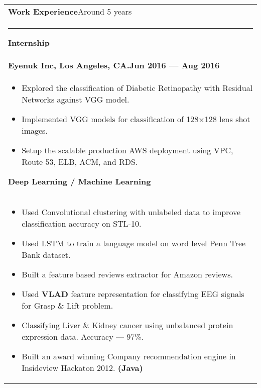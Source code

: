 \documentclass{article}
\begin{document}
\begin{tabular}{p{\dimexpr\linewidth-2\tabcolsep}}
    \textbf{\large{Work Experience}}\hfill Around 5 years \\
    \noindent\rule{\textwidth}{0.4pt}
    \bfseries \large{Internship}\\
    {\bfseries Eyenuk Inc, Los Angeles, CA\@.\hfill Jun 2016 --- Aug 2016} \\
    \begin{itemize}
        \item Explored the classification of Diabetic Retinopathy with Residual Networks against VGG model.
        \item Implemented VGG models for classification of 128$\times$128 lens shot images.
        \item Setup the scalable production AWS deployment using VPC, Route 53, ELB, ACM, and RDS\@.
    \end{itemize}

    \bigskip
    \bfseries \large{Deep Learning / Machine Learning} \\
    \begin{itemize}
        \item Used Convolutional clustering with unlabeled data to improve classification accuracy on STL-10.
        \item Used LSTM to train a language model on word level Penn Tree Bank dataset.
        \item Built a feature based reviews extractor for Amazon reviews.
        \item Used \textbf{VLAD} feature representation for classifying EEG signals for Grasp \& Lift problem.
        \item Classifying Liver \& Kidney cancer using unbalanced protein expression data. Accuracy --- 97\%.
        \item Built an award winning Company recommendation engine in Insideview Hackaton 2012. \textbf{(Java)}
    \end{itemize}


\end{tabular}
\end{document}
